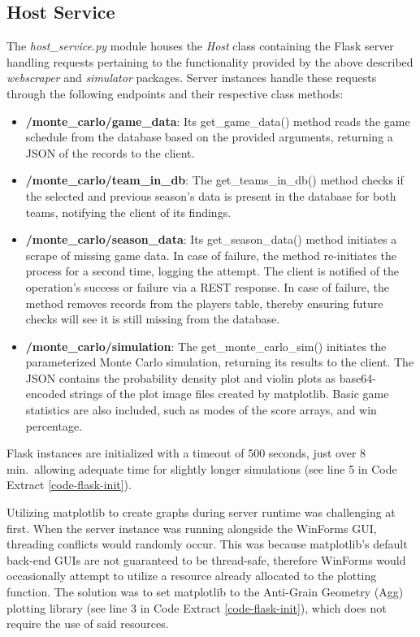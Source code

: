 \documentclass{thesis-ekf}
\theoremstyle{definition}
\theoremstyle{remark}
\begin{document}
\subsection{Host Service}
The \emph{host\_service.py} module houses the \emph{Host} class containing the Flask server handling requests pertaining to the functionality provided by the above described \emph{webscraper} and \emph{simulator} packages. Server instances handle these requests through the following endpoints and their respective class methods:
\begin{itemize}
	\item \textbf{/monte\_carlo/game\_data}: Its get\_game\_data() method reads the game schedule from the database based on the provided arguments, returning a JSON of the records to the client.
	
	\item \textbf{/monte\_carlo/team\_in\_db}: The get\_teams\_in\_db() method checks if the selected and previous season's data is present in the database for both teams, notifying the client of its findings.
	
	\item \textbf{/monte\_carlo/season\_data}: Its get\_season\_data() method initiates a scrape of missing game data. In case of failure, the method re-initiates the process for a second time, logging the attempt. The client is notified of the operation's success or failure via a REST response. In case of failure, the method removes records from the players table, thereby ensuring future checks will see it is still missing from the database.
	
	\item \textbf{/monte\_carlo/simulation}: The get\_monte\_carlo\_sim() initiates the parameterized Monte Carlo simulation, returning its results to the client. The JSON contains the probability density plot and violin plots as base64-encoded strings of the plot image files created by matplotlib. Basic game statistics are also included, such as modes of the score arrays, and win percentage. 
\end{itemize}

Flask instances are initialized with a timeout of 500 seconds, just over 8 min.~allowing adequate time for slightly longer simulations (see line 5 in Code Extract \ref{code-flask-init}). 

Utilizing matplotlib to create graphs during server runtime was challenging at first. When the server instance was running alongside the WinForms GUI, threading conflicts would randomly occur. This was because matplotlib's default back-end GUIs are not guaranteed to be thread-safe, therefore WinForms would occasionally attempt to utilize a resource already allocated to the plotting function. The solution was to set matplotlib to the Anti-Grain Geometry (Agg) plotting library (see line 3 in Code Extract \ref{code-flask-init}), which does not require the use of said resources. \cite{agg}
\end{document}
